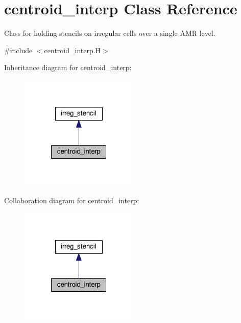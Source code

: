 \hypertarget{classcentroid__interp}{}\section{centroid\+\_\+interp Class Reference}
\label{classcentroid__interp}


Class for holding stencils on irregular cells over a single A\+MR level.  




{\ttfamily \#include $<$centroid\+\_\+interp.\+H$>$}



Inheritance diagram for centroid\+\_\+interp\+:\nopagebreak
\begin{figure}[H]
\begin{center}
\leavevmode
\includegraphics[width=160pt]{classcentroid__interp__inherit__graph}
\end{center}
\end{figure}


Collaboration diagram for centroid\+\_\+interp\+:\nopagebreak
\begin{figure}[H]
\begin{center}
\leavevmode
\includegraphics[width=160pt]{classcentroid__interp__coll__graph}
\end{center}
\end{figure}
